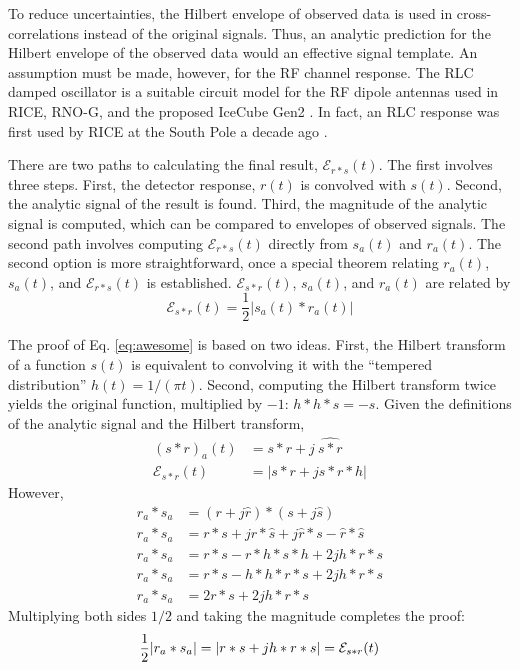 \documentclass[amsmath,amssymb,aps,prd,10pt,twocolumn,showkeys]{revtex4}
\begin{document}
To reduce uncertainties, the Hilbert envelope of observed data is used in cross-correlations instead of the original signals.  Thus, an analytic prediction for the Hilbert envelope of the observed data would an effective signal template.  An assumption must be made, however, for the RF channel response.  The RLC damped oscillator is a suitable circuit model for the RF dipole antennas used in RICE, RNO-G, and the proposed IceCube Gen2 \cite{10.1088/1748-0221/16/03/p03025,10.48550/arxiv.2008.04323}.  In fact, an RLC response was first used by RICE at the South Pole a decade ago \cite{10.1103/PhysRevD.85.062004}.

There are two paths to calculating the final result, $\mathcal{E}_{r*s}(t)$.  The first involves three steps.  First, the detector response, $r(t)$ is convolved with $s(t)$.  Second, the analytic signal of the result is found.  Third, the magnitude of the analytic signal is computed, which can be compared to envelopes of observed signals.  The second path involves computing $\mathcal{E}_{r*s}(t)$ directly from $s_a(t)$ and $r_a(t)$.  The second option is more straightforward, once a special theorem relating $r_a(t)$, $s_a(t)$, and $\mathcal{E}_{r*s}(t)$ is established.  $\mathcal{E}_{s * r}(t)$, $s_a(t)$, and $r_a(t)$ are related by
\begin{equation}
\mathcal{E}_{s * r}(t) = \frac{1}{2}| s_a (t) * r_a(t)| \label{eq:awesome}
\end{equation}

The proof of Eq. \ref{eq:awesome} is based on two ideas.  First, the Hilbert transform of a function $s(t)$ is equivalent to convolving it with the ``tempered distribution'' $h(t) = 1/(\pi t)$.  Second, computing the Hilbert transform twice yields the original function, multiplied by $-1$: $h * h * s = -s$.  Given the definitions of the analytic signal and the Hilbert transform,
\begin{align}
(s * r)_a (t) &= s * r + j ~ \widehat{s*r} \\
\mathcal{E}_{s * r}(t) &= | s * r + j s * r * h|
\end{align}
However,
\begin{align}
r_a * s_a &= (r + j \hat{r}) * (s + j \hat{s}) \\
r_a * s_a &= r * s + j r * \hat{s} + j \hat{r} * s - \hat{r} * \hat{s} \\
r_a * s_a &= r * s - r * h * s * h + 2 j h * r * s \\
r_a * s_a &= r * s - h * h * r * s + 2 j h * r * s \\
r_a * s_a &= 2 r * s + 2 j h * r * s
\end{align}
Multiplying both sides $1/2$ and taking the magnitude completes the proof:
\begin{equation}
\frac{1}{2} |r_a * s_a| = |r * s + j h * r * s| = \mathcal{E}_{s * r}(t) \\
\end{equation}
\end{document}
